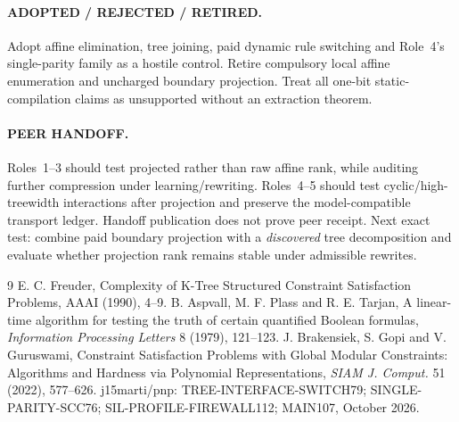 \documentclass[11pt]{article}
\begin{document}
\paragraph{ADOPTED / REJECTED / RETIRED.}
Adopt affine elimination, tree joining, paid dynamic rule switching
and Role~4's single-parity family as a hostile control.
Retire compulsory local affine enumeration and uncharged
boundary projection. Treat all one-bit static-compilation claims
as unsupported without an extraction theorem.
\paragraph{PEER HANDOFF.}
Roles~1--3 should test projected rather than raw affine rank,
while auditing further compression under learning/rewriting.
Roles~4--5 should test cyclic/high-treewidth interactions after
projection and preserve the model-compatible transport ledger.
Handoff publication does not prove peer receipt.
Next exact test: combine paid boundary projection with a
\emph{discovered} tree decomposition and evaluate whether
projection rank remains stable under admissible rewrites.

\begin{thebibliography}{9}
 E. C. Freuder,
Complexity of K-Tree Structured Constraint Satisfaction Problems,
AAAI (1990), 4--9.
 B. Aspvall, M. F. Plass and R. E. Tarjan,
A linear-time algorithm for testing the truth of certain
quantified Boolean formulas, \emph{Information Processing Letters}
8 (1979), 121--123.
 J. Brakensiek, S. Gopi and V. Guruswami,
Constraint Satisfaction Problems with Global Modular Constraints:
Algorithms and Hardness via Polynomial Representations,
\emph{SIAM J. Comput.} 51 (2022), 577--626.
 j15marti/pnp: TREE-INTERFACE-SWITCH79;
SINGLE-PARITY-SCC76; SIL-PROFILE-FIREWALL112; MAIN107, October 2026.
\end{thebibliography}
\end{document}

